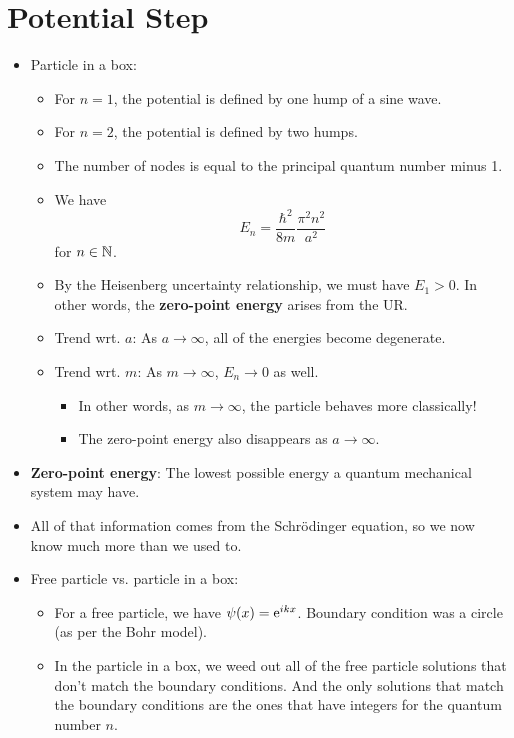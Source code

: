 \documentclass[../notes.tex]{subfiles}
\begin{document}
\section{Potential Step}
\begin{itemize}
    \item {}Particle in a box:
    \begin{itemize}
        \item For $n=1$, the potential is defined by one hump of a sine wave.
        \item For $n=2$, the potential is defined by two humps.
        \item The number of nodes is equal to the principal quantum number minus 1.
        \item We have
        \begin{equation*}
            E_n = \frac{\hbar^2}{8m}\frac{\pi^2n^2}{a^2}
        \end{equation*}
        for $n\in\N$.
        \item By the Heisenberg uncertainty relationship, we must have $E_1>0$. In other words, the \textbf{zero-point energy} arises from the UR.
        \item Trend wrt. $a$: As $a\to\infty$, all of the energies become degenerate.
        \item Trend wrt. $m$: As $m\to\infty$, $E_n\to 0$ as well.
        \begin{itemize}
            \item In other words, as $m\to\infty$, the particle behaves more classically!
            \item The zero-point energy also disappears as $a\to\infty$.
        \end{itemize}
    \end{itemize}
    \item \textbf{Zero-point energy}: The lowest possible energy a quantum mechanical system may have.
    \item All of that information comes from the Schr\"{o}dinger equation, so we now know much more than we used to.
    \item Free particle vs. particle in a box:
    \begin{itemize}
        \item For a free particle, we have $\psi(x)=\e[ikx]$. Boundary condition was a circle (as per the Bohr model).
        \item In the particle in a box, we weed out all of the free particle solutions that don't match the boundary conditions. And the only solutions that match the boundary conditions are the ones that have integers for the quantum number $n$.

\end{itemize}
\end{itemize}
\end{document}
